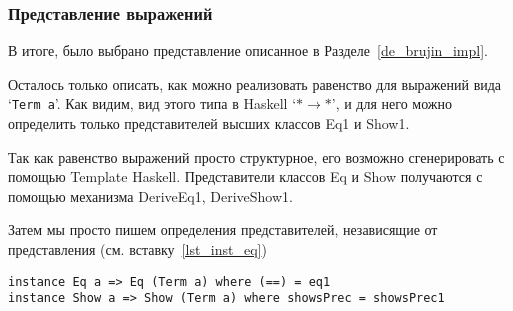 \pagebreak
\subsubsection{Представление выражений}\label{final_repr}

В итоге, было выбрано представление описанное в Разделе~\ref{de_brujin_impl}.

Осталось только описать, как можно реализовать равенство для выражений вида `\lstinline{Term a}'. Как видим, вид этого типа в Haskell `$* \rightarrow *$', и для него можно определить только представителей высших классов\cite{prel_extras} Eq1 и Show1.

Так как равенство выражений просто структурное, его возможно сгенерировать с помощью Template Haskell\cite{TH}. Представители классов Eq и Show получаются с помощью механизма DeriveEq1, DeriveShow1\cite{deriveCompat}.

Затем мы просто пишем определения представителей, независящие от представления (см. вставку~\ref{lst_inst_eq})

\begin{lstlisting}[caption={Определение представителей классов Eq и Show для представления АСД}, captionpos=b, frame=single, float,floatplacement=H, label = {lst_inst_eq}]
instance Eq a => Eq (Term a) where (==) = eq1
instance Show a => Show (Term a) where showsPrec = showsPrec1
\end{lstlisting}


